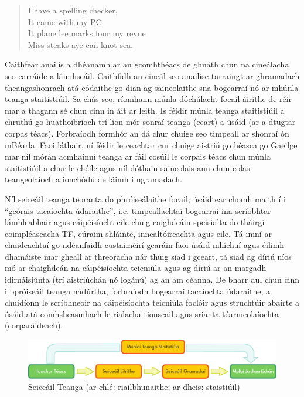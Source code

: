 \documentclass[]{../../metanetpaper}
\begin{document}
\begin{multicols}{2}
\begin{quote}
  I have a spelling checker,\\
  It came with my PC.\\
  It plane lee marks four my revue\\
  Miss steaks aye can knot sea.
\end{quote}

Caithfear anailís a dhéanamh ar an gcomhthéacs de ghnáth chun na cineálacha seo earráide a láimhseáil. Caithfidh an cineál seo anailíse tarraingt ar ghramadach theangashonrach atá códaithe go dian ag saineolaithe sna bogearraí nó ar mhúnla teanga staitistiúil. Sa chás seo, ríomhann múnla dóchúlacht focail áirithe de réir mar a thagann sé chun cinn in áit ar leith. Is féidir múnla teanga staitistiúil a chruthú go huathoibríoch trí líon mór sonraí teanga (ceart) a úsáid (ar a dtugtar corpas téacs). Forbraíodh formhór an dá chur chuige seo timpeall ar shonraí ón mBéarla. Faoi láthair, ní féidir le ceachtar cur chuige aistriú go héasca go Gaeilge mar níl mórán acmhainní teanga ar fáil cosúil le corpais téacs chun múnla staitistiúil a chur le chéile agus níl dóthain saineolais ann chun eolas teangeolaíoch a ionchódú de láimh i ngramadach.


Níl seiceáil teanga teoranta do phróiseálaithe focail; úsáidtear chomh maith í i “gcórais tacaíochta údaraithe”, i.e. timpeallachtaí bogearraí ina scríobhtar lámhleabhair agus cáipéisíocht eile chuig caighdeáin speisialta do tháirgí coimpléascacha TF, cúraim shláinte, innealtóireachta agus eile. Tá imní ar chuideachtaí go ndéanfaidh custaiméirí gearáin faoi úsáid mhíchuí agus éilimh dhamáiste mar gheall ar threoracha nár thuig siad i gceart, tá siad ag díriú níos mó ar chaighdeán na cáipéisíochta teicniúla agus ag díriú ar an margadh idirnáisiúnta (trí aistriúchán nó logánú) ag an am céanna. De bharr dul chun cinn i bpróiseáil teanga nádúrtha, forbraíodh bogearraí tacaíochta údaraithe, a chuidíonn le scríbhneoir na cáipéisíochta teicniúla foclóir agus struchtúir abairte a úsáid atá comhsheasmhach le rialacha tionscail agus srianta téarmeolaíochta (corparáideach).

\begin{figure}[htb]
  \center
  \includegraphics[width=\textwidth]{../_media/irish/language_checking}
  \caption{Seiceáil Teanga (ar chlé: riailbhunaithe; ar dheis: staistiúil)}
  \label{fig:langcheckingaarch_de}
\end{figure}


\end{multicols}
\end{document}
